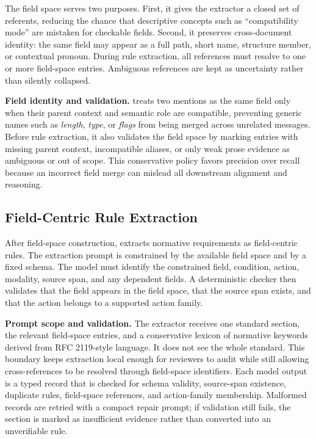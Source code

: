 The field space serves two purposes. First, it gives the extractor a closed set
of referents, reducing the chance that descriptive concepts such as
``compatibility mode'' are mistaken for checkable fields. Second, it preserves
cross-document identity: the same field may appear as a full path, short name,
structure member, or contextual pronoun. During rule extraction, all references
must resolve to one or more field-space entries. Ambiguous references are kept
as uncertainty rather than silently collapsed.

\textbf{Field identity and validation.}
\tool{} treats two mentions as the same field only when their parent context
and semantic role are compatible, preventing generic names such as
\emph{length}, \emph{type}, or \emph{flags} from being merged across unrelated
messages. Before rule extraction, it also validates the field space by marking
entries with missing parent context, incompatible aliases, or only weak prose
evidence as ambiguous or out of scope. This conservative policy favors
precision over recall because an incorrect field merge can mislead all
downstream alignment and reasoning.

\subsection{Field-Centric Rule Extraction}
\label{sec:rules}

After field-space construction, \tool{} extracts normative requirements as
field-centric rules. The extraction prompt is constrained by the available field
space and by a fixed schema. The model must identify the constrained field,
condition, action, modality, source span, and any dependent fields. A
deterministic checker then validates that the field appears in the field space,
that the source span exists, and that the action belongs to a supported action
family.

\textbf{Prompt scope and validation.}
The extractor receives one standard section, the relevant field-space entries,
and a conservative lexicon of normative keywords derived from RFC 2119-style
language. It does not see the whole standard. This boundary keeps extraction
local enough for reviewers to audit while still allowing cross-references to be
resolved through field-space identifiers. Each model output is a typed record
that is checked for schema validity, source-span existence, duplicate rules,
field-space references, and action-family membership. Malformed records are
retried with a compact repair prompt; if validation still fails, the section is
marked as insufficient evidence rather than converted into an unverifiable
rule.

